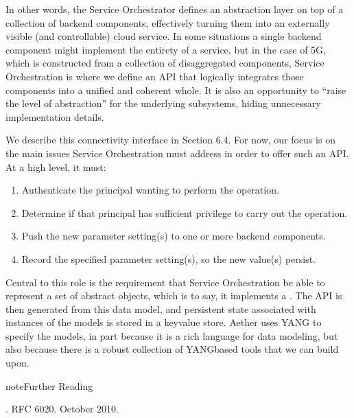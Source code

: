 \documentclass[a4paper,11pt,english]{sphinxmanual}
\begin{document}
\sphinxAtStartPar
In other words, the Service Orchestrator defines an abstraction layer
on top of a collection of backend components, effectively turning them
into an externally visible (and controllable) cloud service. In some
situations a single backend component might implement the entirety of
a service, but in the case of 5G, which is constructed from a
collection of disaggregated components, Service Orchestration is where
we define an API that logically integrates those components into a
unified and coherent whole. It is also an opportunity to “raise the
level of abstraction” for the underlying subsystems, hiding
unnecessary implementation details.

\sphinxAtStartPar
We describe this connectivity interface in Section 6.4. For now, our
focus is on the main issues Service Orchestration must address in
order to offer such an API. At a high level, it must:
\begin{enumerate}
%
\item {} 
\sphinxAtStartPar
Authenticate the principal wanting to perform the operation.

\item {} 
\sphinxAtStartPar
Determine if that principal has sufficient privilege to carry out the
operation.

\item {} 
\sphinxAtStartPar
Push the new parameter setting(s) to one or more backend components.

\item {} 
\sphinxAtStartPar
Record the specified parameter setting(s), so the new value(s)
persist.

\end{enumerate}

\sphinxAtStartPar
Central to this role is the requirement that Service Orchestration be
able to represent a set of abstract objects, which is to say, it
implements a . The API is then generated from this data
model, and persistent state associated with instances of the models is
stored in a key\sphinxhyphen{}value store. Aether uses YANG to specify the models,
in part because it is a rich language for data modeling, but also
because there is a robust collection of YANG\sphinxhyphen{}based tools that we can
build upon.

\label{\detokenize{cloud:reading-yang}}
\begin{sphinxadmonition}{note}{Further Reading}

\sphinxAtStartPar
{}. RFC 6020. October 2010.
\end{sphinxadmonition}
\end{document}
